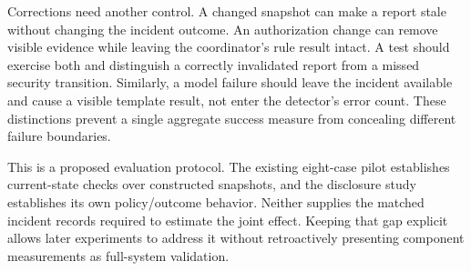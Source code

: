 Corrections need another control. A changed snapshot can make a report stale without changing the incident outcome. An authorization change can remove visible evidence while leaving the coordinator's rule result intact. A test should exercise both and distinguish a correctly invalidated report from a missed security transition. Similarly, a model failure should leave the incident available and cause a visible template result, not enter the detector's error count. These distinctions prevent a single aggregate success measure from concealing different failure boundaries.

This is a proposed evaluation protocol. The existing eight-case pilot establishes current-state checks over constructed snapshots, and the disclosure study establishes its own policy/outcome behavior. Neither supplies the matched incident records required to estimate the joint effect. Keeping that gap explicit allows later experiments to address it without retroactively presenting component measurements as full-system validation.
